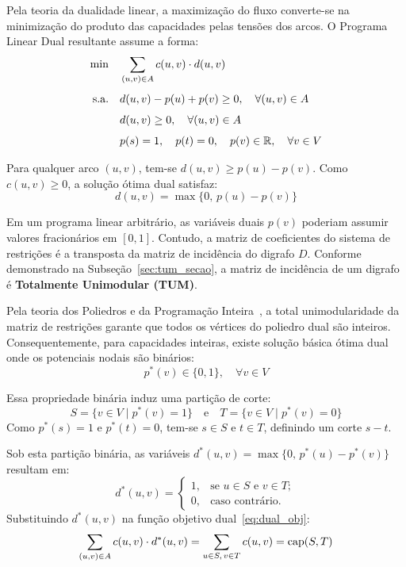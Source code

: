 Pela teoria da dualidade linear, a maximização do fluxo converte-se na minimização do produto das capacidades pelas tensões dos arcos. O Programa Linear Dual resultante assume a forma:
\begin{align}
    \min \quad & \sum_{(u,v) \in A} c(u,v) \cdot d(u,v) \label{eq:dual_obj} \\[4pt]
    \text{s.a.}\quad & d(u,v) - p(u) + p(v) \ge 0, \quad \forall (u,v) \in A \label{eq:dual_tensao} \\[4pt]
    & d(u,v) \ge 0, \quad \forall (u,v) \in A \\[4pt]
    & p(s) = 1, \quad p(t) = 0, \quad p(v) \in \mathbb{R}, \quad \forall v \in V
\end{align}

Para qualquer arco $(u,v)$, tem-se $d(u,v) \ge p(u) - p(v)$. Como $c(u,v) \ge 0$, a solução ótima dual satisfaz:
\begin{equation}
    d(u,v) = \max\{0, \, p(u) - p(v)\}
\end{equation}

Em um programa linear arbitrário, as variáveis duais $p(v)$ poderiam assumir valores fracionários em $[0, 1]$. Contudo, a matriz de coeficientes do sistema de restrições é a transposta da matriz de incidência do digrafo $D$. Conforme demonstrado na Subseção~\ref{sec:tum_secao}, a matriz de incidência de um digrafo é \textbf{Totalmente Unimodular (TUM)}.

Pela teoria dos Poliedros e da Programação Inteira~\cite{cook1998combinatorial, korte2018combinatorial}, a total unimodularidade da matriz de restrições garante que todos os vértices do poliedro dual são inteiros. Consequentemente, para capacidades inteiras, existe solução básica ótima dual onde os potenciais nodais são binários:
\begin{equation}
    p^*(v) \in \{0, 1\}, \quad \forall v \in V
\end{equation}

Essa propriedade binária induz uma partição de corte:
\begin{equation}
    S = \{v \in V \mid p^*(v) = 1\} \quad \text{e} \quad T = \{v \in V \mid p^*(v) = 0\}
\end{equation}
Como $p^*(s) = 1$ e $p^*(t) = 0$, tem-se $s \in S$ e $t \in T$, definindo um corte $s-t$.

Sob esta partição binária, as variáveis $d^*(u,v) = \max\{0, \, p^*(u) - p^*(v)\}$ resultam em:
\begin{equation}
    d^*(u,v) = \begin{cases}
        1, & \text{se } u \in S \text{ e } v \in T; \\
        0, & \text{caso contrário}.
    \end{cases}
\end{equation}
Substituindo $d^*(u,v)$ na função objetivo dual~\eqref{eq:dual_obj}:
\begin{equation}
    \sum_{(u,v) \in A} c(u,v) \cdot d^*(u,v) = \sum_{u \in S, \, v \in T} c(u,v) = \operatorname{cap}(S, T)
\end{equation}

